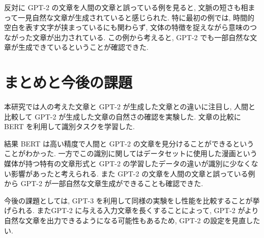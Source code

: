 \documentclass[twocolumn]{jarticle}     %
\begin{document}
反対に GPT-2 の文章を人間の文章と誤っている例を見ると,
文脈の短さも相まって一見自然な文章が生成されていると感じられた.
特に最初の例では, 時間的空白を表す文字が挟まっているにも関わらず, 文体の特徴を捉えながら意味のつながった文章が出力されている.
この例から考えると, GPT-2 でも一部自然な文章が生成できているということが確認できた.

\section{まとめと今後の課題}

本研究では人の考えた文章と GPT-2 が生成した文章との違いに注目し,
人間と比較して GPT-2 が生成した文章の自然さの確認を実験した.
文章の比較に BERT を利用して識別タスクを学習した.

結果 BERT は高い精度で人間と GPT-2 の文章を見分けることができるということがわかった.
一方でこの識別に関してはデータセットに使用した漫画という媒体が持つ特有の文章形式と GPT-2 の学習したデータの違いが識別に少なくない影響があったと考えられる.
また GPT-2 の文章を人間の文章と誤っている例から GPT-2 が一部自然な文章生成ができることも確認できた.


今後の課題としては, GPT-3 を利用して同様の実験をし性能を比較することが挙げられる.
またGPT-2 に与える入力文章を長くすることによって, GPT-2 がより自然な文章を出力できるようになる可能性もあるため, GPT-2 の設定を見直したい.



\end{document}

